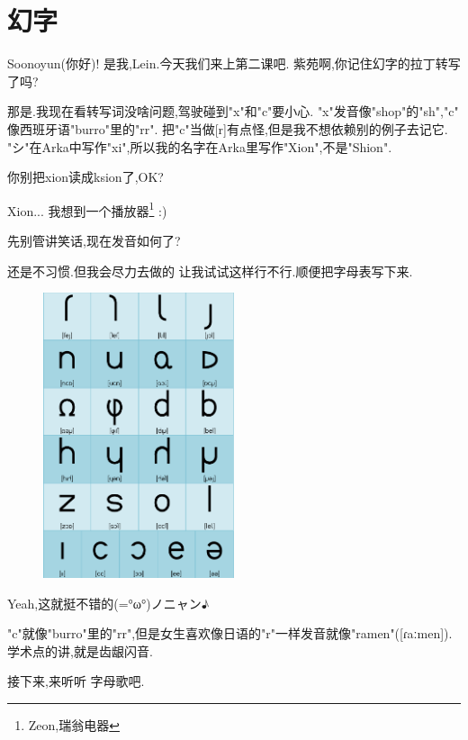 \chapter[幻字]{幻字}




Soonoyun(你好)! 是我,Lein.今天我们来上第二课吧.
紫苑啊,你记住幻字的拉丁转写了吗?


那是.我现在看转写词没啥问题,驾驶碰到"x"和"c"要小心. 
"x"发音像"shop"的"sh","c" 像西班牙语"burro"里的"rr".
把"c"当做[r]有点怪,但是我不想依赖别的例子去记它.
"シ"在Arka中写作"xi",所以我的名字在Arka里写作"Xion",不是"Shion".



你别把xion读成ksion了,OK?


Xion... 我想到一个播放器\footnote{Zeon,瑞翁电器} :)


先别管讲笑话,现在发音如何了?

还是不习惯.但我会尽力去做的
让我试试这样行不行.顺便把字母表写下来.


\begin{figure}[H]
\includegraphics[width=0.5\textwidth]{ARKA/lemal.png}
\end{figure}
Yeah,这就挺不错的(=°ω°)ノニャン♪

"c"就像"burro"里的"rr",但是女生喜欢像日语的"r"一样发音就像"ramen"([ɾaːmen]). 
学术点的讲,就是齿龈闪音.

接下来,来听听
{字母歌}吧.
